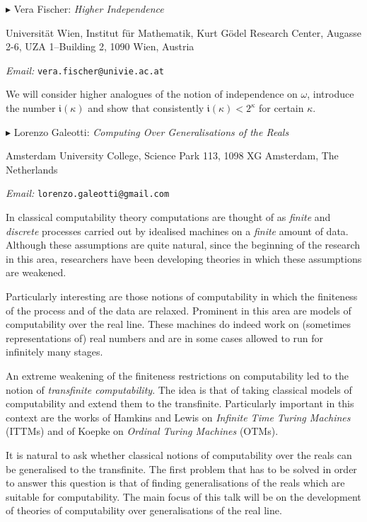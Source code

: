 \documentclass[a4paper]{amsart}
\theoremstyle{remark}
\newcommand{\vsp}{\vspace{20pt}}
\begin{document}
\vsp 

\noindent 
$\blacktriangleright$ Vera Fischer: \emph{Higher Independence} 

\noindent 
Universit\"at Wien, Institut f\"ur Mathematik, 
Kurt G\"odel Research Center, 
Augasse 2-6, UZA 1--Building 2, 
1090 Wien, Austria 

\noindent 
\emph{Email:} \texttt{vera.fischer@univie.ac.at}

We will consider higher analogues of the notion of 
independence on $\omega$, introduce the number $\mathfrak{i}(\kappa)$ 
and show that consistently $\mathfrak{i}(\kappa)<2^\kappa$ for certain 
$\kappa$.












\vsp 

\noindent 
$\blacktriangleright$ Lorenzo Galeotti: \emph{Computing Over Generalisations of the Reals} 

\noindent 
Amsterdam University College, 
Science Park 113, 
1098 XG Amsterdam, 
The Netherlands


\noindent 
\emph{Email:} \texttt{lorenzo.galeotti@gmail.com}

In classical computability theory computations are thought of as \emph{finite} and \emph{discrete} processes carried out by idealised machines on a \emph{finite} amount of data. Although these assumptions are quite natural, since the beginning of the research in this area, researchers have been developing theories in which these assumptions are weakened.

Particularly interesting are those notions of computability in which the finiteness of the process and of the data are relaxed. Prominent in this area are models of computability over the real line. These machines do indeed work on (sometimes representations of) real numbers and are in some cases allowed to run for infinitely many stages. 


An extreme weakening of the finiteness restrictions on computability led to the notion of \emph{transfinite computability}. The idea is that of taking classical models of computability and extend them to the transfinite. Particularly important in this context are the works of Hamkins and Lewis on \emph{Infinite Time Turing Machines} (ITTMs) and of Koepke on \emph{Ordinal Turing Machines} (OTMs).


It is natural to ask whether classical notions of computability over the reals can be generalised to the transfinite. The first problem that has to be solved in order to answer this question is that of finding generalisations of the reals which are suitable for computability. The main focus of this talk will be on the development of theories of computability over generalisations of the real line. 
\end{document}
